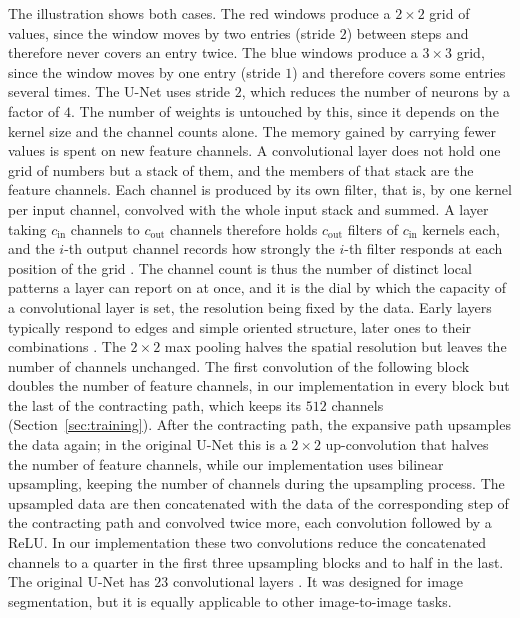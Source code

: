 \documentclass{article}
\numberwithin{equation}{section}
\begin{document}
The illustration shows both cases. The red windows produce a $2\times 2$ grid of values,
since the window moves by two entries (stride $2$) between steps and therefore never covers an entry twice.
The blue windows produce a $3\times 3$ grid, since the window moves by one entry (stride $1$) and therefore covers some entries several times.
The U-Net uses stride $2$, which reduces the number of neurons by a factor of $4$. The number of
weights is untouched by this, since it depends on the kernel size and the channel counts alone.
The memory gained by carrying fewer values is spent on new feature channels.
A convolutional layer does not hold one grid of numbers but a stack of them, and the members of that stack are the
feature channels. Each channel is produced by its own filter, that is, by one kernel per input channel, convolved with
the whole input stack and summed. A layer taking $c_\text{in}$ channels to $c_\text{out}$ channels therefore holds
$c_\text{out}$ filters of $c_\text{in}$ kernels each, and the $i$-th output channel records how strongly the $i$-th
filter responds at each position of the grid \parencite{Goodfellow}. The channel count is thus the number of
distinct local patterns a layer can report on at once, and it is the dial by which the capacity of a convolutional
layer is set, the resolution being fixed by the data. Early layers typically respond to edges and simple oriented
structure, later ones to their combinations \parencite{LeCun1998}.
The $2\times2$ max pooling halves the spatial resolution but leaves the number of channels unchanged.
The first convolution of the following block doubles the number of feature channels, in our
implementation in every block but the last of the contracting path, which keeps its $512$ channels
(Section~\ref{sec:training}).
After the contracting path, the expansive path upsamples the data again; in the original U-Net this is a
$2\times 2$ up-convolution that halves the number of feature channels, while our implementation uses
bilinear upsampling, keeping the number of channels during the upsampling process.
The upsampled data are then concatenated with the data of the corresponding step of the contracting path and convolved twice more, each convolution followed by a ReLU\@.
In our implementation these two convolutions reduce the concatenated channels to a quarter in the first
three upsampling blocks and to half in the last.
The original U-Net has $23$ convolutional layers \parencite{U-NET}. It was designed for image segmentation,
but it is equally applicable to other image-to-image tasks.
\end{document}
